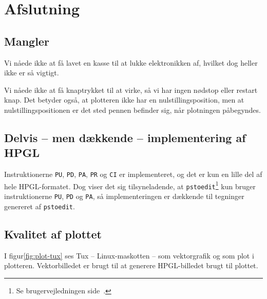 \chapter{Afslutning}
\label{ch:afslutning}




\section{Mangler}

Vi nåede ikke at få lavet en kasse til at lukke elektronikken af,
hvilket dog heller ikke er så vigtigt.

Vi nåede ikke at få knaptrykket til at virke, så vi har ingen nødstop
eller restart knap. Det betyder også, at plotteren ikke har en
nulstillingsposition, men at nulstillingspositionen er det sted pennen
befinder sig, når plotningen påbegyndes.


\section{Delvis -- men dækkende -- implementering af HPGL}

Instruktionerne \texttt{PU}, \texttt{PD}, \texttt{PA}, \texttt{PR} og
\texttt{CI} er implementeret, og det er kun en lille del af hele
HPGL-formatet. Dog viser det sig tilsyneladende, at
\texttt{pstoedit}\footnote{Se brugervejledningen
  side~\pageref{ch:brugervejledning}.} kun bruger instruktionerne
\texttt{PU}, \texttt{PD} og \texttt{PA}, så implementeringen er
dækkende til tegninger genereret af \texttt{pstoedit}.


\section{Kvalitet af plottet}

I figur\vref{fig:plot-tux} ses Tux -- Linux-maskotten -- som
vektorgrafik og som plot i plotteren. Vektorbilledet er brugt til at
generere HPGL-billedet brugt til plottet. 


